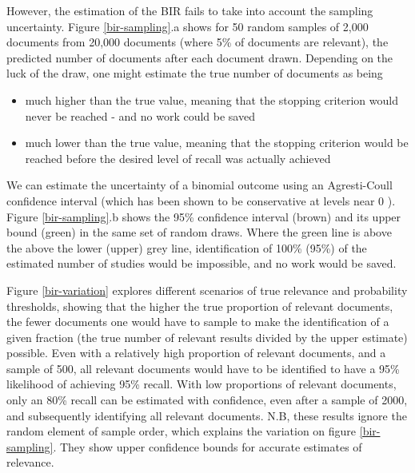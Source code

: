 \documentclass{bmcart}
\begin{document}
	
	However, the estimation of the BIR fails to take into account the sampling uncertainty. 
	Figure \ref{bir-sampling}.a shows for 50 random samples of 2,000 documents from 20,000 documents (where 5\% of documents are relevant), the predicted number of documents after each document drawn. 
	Depending on the luck of the draw, one might estimate the true number of documents as being
	\begin{itemize}
		\item much higher than the true value, meaning that the stopping criterion would never be reached - and no work could be saved
		\item much lower than the true value, meaning that the stopping criterion would be reached before the desired level of recall was actually achieved
	\end{itemize}
	
	We can estimate the uncertainty of a binomial outcome using an Agresti-Coull confidence interval (which has been shown to be conservative at levels near 0  \cite{Brown2001}). 
	Figure \ref{bir-sampling}.b shows the 95\% confidence interval (brown) and its upper bound (green) in the same set of random draws. 
	Where the green line is above the above the lower (upper) grey line, identification of 100\% (95\%) of the estimated number of studies would be impossible, and no work would be saved.
	
	Figure \ref{bir-variation} explores different scenarios of true relevance and probability thresholds, showing that the higher the true proportion of relevant documents, the fewer documents one would have to sample to make the identification of a given fraction (the true number of relevant results divided by the upper estimate) possible. 
	Even with a relatively high proportion of relevant documents, and a sample of 500, all relevant documents would have to be identified to have a 95\% likelihood of achieving 95\% recall. 
	With low proportions of relevant documents, only an 80\% recall can be estimated with confidence, even after a sample of 2000, and subsequently identifying all relevant documents. 
	N.B, these results ignore the random element of sample order, which explains the variation on figure \ref{bir-sampling}. 
	They show upper confidence bounds for accurate estimates of relevance.
\end{document}
